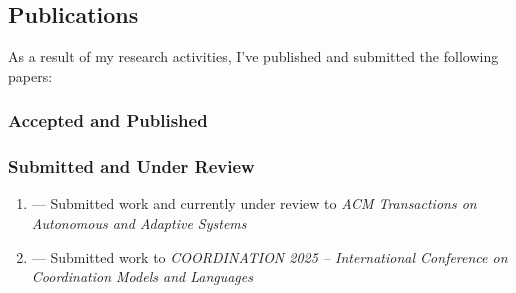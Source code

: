 \documentclass[runningheads]{llncs}
\begin{document}

\subsection{Publications}
\label{sec:publications}

As a result of my research activities,
I've published and submitted the following papers:

\subsubsection{Accepted and Published}
\begin{refsection}
    \nocite{*} %
    \printbibliography[heading=none]
\end{refsection}

\subsubsection{Submitted and Under Review}
\begin{enumerate}
    \item {} --- Submitted work and currently under review to \emph{ACM Transactions on Autonomous and Adaptive Systems} 
    \item {} --- Submitted work to \emph{COORDINATION 2025 -- International Conference on Coordination Models and Languages}
\end{enumerate}

\end{document}
